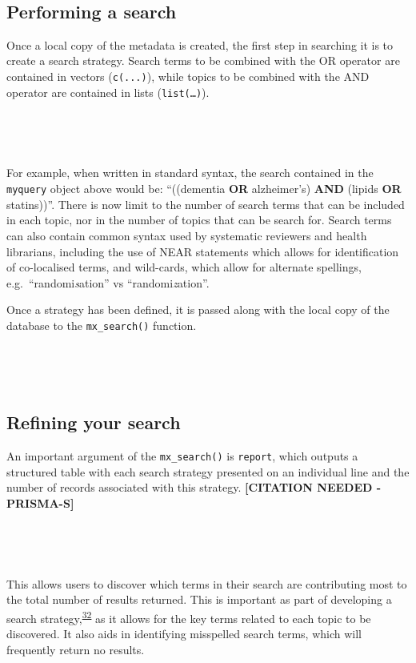 \documentclass[a4paper, twoside]{templates/ociamthesis}
\begin{document}
~

\hypertarget{performing-a-search}{%
\subsection{Performing a search}\label{performing-a-search}}

Once a local copy of the metadata is created, the first step in searching it is to create a search strategy. Search terms to be combined with the OR operator are contained in vectors (\texttt{c(...)}), while topics to be combined with the AND operator are contained in lists (\texttt{list(\ldots{})}).

~

~

For example, when written in standard syntax, the search contained in the \texttt{myquery} object above would be: ``((dementia \textbf{OR} alzheimer's) \textbf{AND} (lipids \textbf{OR} statins))''. There is now limit to the number of search terms that can be included in each topic, nor in the number of topics that can be search for. Search terms can also contain common syntax used by systematic reviewers and health librarians, including the use of NEAR statements which allows for identification of co-localised terms, and wild-cards, which allow for alternate spellings, e.g.~``randomi\emph{s}ation'' vs ``randomi\emph{z}ation''.

Once a strategy has been defined, it is passed along with the local copy of the database to the \texttt{mx\_search()} function.

~

~

\hypertarget{refining-your-search}{%
\subsection{Refining your search}\label{refining-your-search}}

An important argument of the \texttt{mx\_search()} is \texttt{report}, which outputs a structured table with each search strategy presented on an individual line and the number of records associated with this strategy. \textbf{{[}CITATION NEEDED - PRISMA-S{]}}

~

~

This allows users to discover which terms in their search are contributing most to the total number of results returned. This is important as part of developing a search strategy,\textsuperscript{\protect\hyperlink{ref-bramer2018}{32}} as it allows for the key terms related to each topic to be discovered. It also aids in identifying misspelled search terms, which will frequently return no results.
\end{document}
